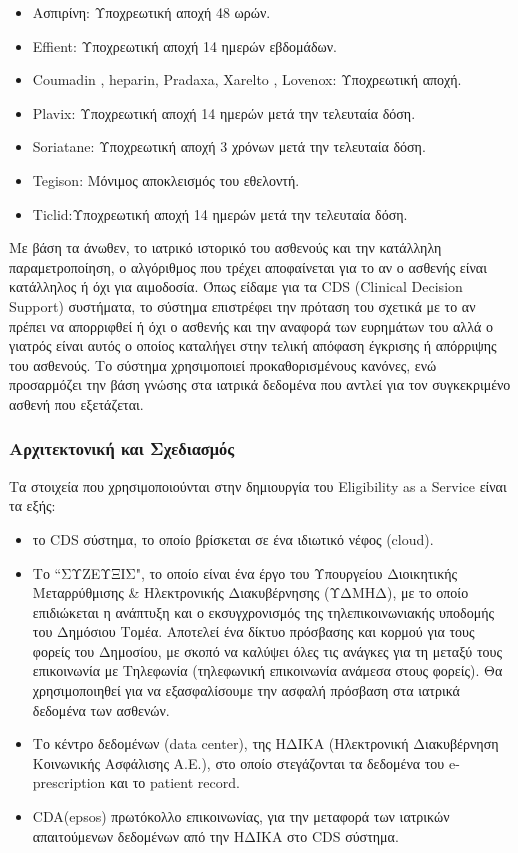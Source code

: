 \begin{itemize}
		\item Ασπιρίνη: Υποχρεωτική αποχή 48 ωρών.
		\item Effient: Υποχρεωτική αποχή 14 ημερών εβδομάδων.
		\item Coumadin , heparin, Pradaxa, Xarelto , Lovenox: Υποχρεωτική αποχή.
		\item Plavix: Υποχρεωτική αποχή 14 ημερών μετά την τελευταία δόση.
		\item Soriatane: Υποχρεωτική αποχή 3 χρόνων μετά την τελευταία δόση.
		\item Tegison: Μόνιμος αποκλεισμός του εθελοντή. 
		\item Ticlid:Υποχρεωτική αποχή 14 ημερών μετά την τελευταία δόση.
	

		\end{itemize}
		Με βάση τα άνωθεν, το ιατρικό ιστορικό του ασθενούς και την κατάλληλη παραμετροποίηση, ο αλγόριθμος που τρέχει αποφαίνεται για το αν ο ασθενής είναι κατάλληλος ή όχι για αιμοδοσία. Όπως είδαμε για τα CDS (Clinical Decision Support) συστήματα, το σύστημα επιστρέφει την πρόταση του σχετικά με το αν πρέπει να απορριφθεί ή όχι ο ασθενής και την αναφορά των ευρημάτων του αλλά ο γιατρός είναι αυτός ο οποίος καταλήγει στην τελική απόφαση έγκρισης ή απόρριψης του ασθενούς. Το σύστημα χρησιμοποιεί προκαθορισμένους κανόνες, ενώ προσαρμόζει την βάση γνώσης στα ιατρικά δεδομένα που αντλεί για τον συγκεκριμένο ασθενή που εξετάζεται.
	
		
	\subsubsection{Αρχιτεκτονική και Σχεδιασμός}
		
		Τα στοιχεία που χρησιμοποιούνται στην δημιουργία του Eligibility as a Service είναι τα εξής:
		
		\begin{itemize}
		
		\item το CDS σύστημα, το οποίο βρίσκεται σε ένα ιδιωτικό νέφος (cloud).

		\item Το ``ΣΥΖΕΥΞΙΣ", το οποίο είναι ένα έργο του Υπουργείου Διοικητικής Μεταρρύθμισης \& Ηλεκτρονικής Διακυβέρνησης (ΥΔΜΗΔ), με το οποίο επιδιώκεται η ανάπτυξη και ο εκσυγχρονισμός της τηλεπικοινωνιακής υποδομής του Δημόσιου Τομέα. Αποτελεί  ένα δίκτυο πρόσβασης και κορμού για τους φορείς του Δημοσίου, με σκοπό να καλύψει όλες τις ανάγκες για τη μεταξύ τους επικοινωνία με  Τηλεφωνία (τηλεφωνική επικοινωνία ανάμεσα στους φορείς). Θα χρησιμοποιηθεί για να εξασφαλίσουμε την ασφαλή πρόσβαση στα ιατρικά δεδομένα των ασθενών.
		
		\item Το κέντρο δεδομένων (data center), της ΗΔΙΚΑ (Ηλεκτρονική Διακυβέρνηση Κοινωνικής Ασφάλισης Α.Ε.), στο οποίο στεγάζονται τα δεδομένα του e-prescription και το patient record.
		

		\item CDA(epsos) πρωτόκολλο επικοινωνίας, για την μεταφορά των ιατρικών απαιτούμενων δεδομένων από την ΗΔΙΚΑ στο CDS σύστημα.
			
		\end{itemize}				
		
